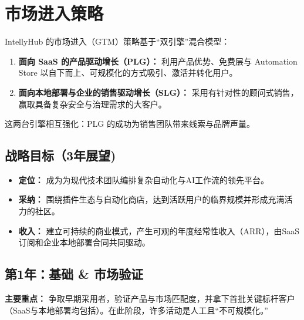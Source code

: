 \documentclass[11pt, a4paper, oneside]{article}
\begin{document}
\newpage
\section{市场进入策略}

IntellyHub 的市场进入（GTM）策略基于“双引擎”混合模型：
\begin{enumerate}
    \item \textbf{面向 SaaS 的产品驱动增长（PLG）：} 利用产品优势、免费层与 Automation Store 以自下而上、可规模化的方式吸引、激活并转化用户。
    \item \textbf{面向本地部署与企业的销售驱动增长（SLG）：} 采用有针对性的顾问式销售，赢取具备复杂安全与治理需求的大客户。
\end{enumerate}
这两台引擎相互强化：PLG 的成功为销售团队带来线索与品牌声量。




\subsection{战略目标（3年展望)}
\begin{itemize}
    \item \textbf{定位：} 成为为现代技术团队编排复杂自动化与AI工作流的领先平台。
    \item \textbf{采纳：} 围绕插件生态与自动化商店，达到活跃用户的临界规模并形成充满活力的社区。
    \item \textbf{收入：} 建立可持续的商业模式，产生可观的年度经常性收入（ARR），由SaaS订阅和企业本地部署合同共同驱动。
\end{itemize}

\subsection{第1年：基础 \& 市场验证}
\textbf{主要重点：} 争取早期采用者，验证产品与市场匹配度，并拿下首批关键标杆客户（SaaS与本地部署均包括）。在此阶段，许多活动是人工且“不可规模化。”
\end{document}
